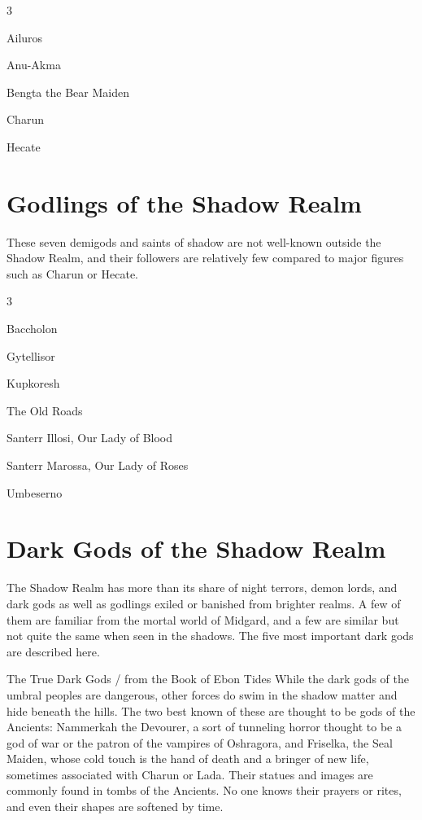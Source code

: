 \documentclass[10pt,a4paper,twoside,bg=print,twocolumn,openany,nodeprecatedcode]{dndbook}
\begin{document}
\begin{itemize}
\begin{multicols}{3}
\item Ailuros
\item Anu-Akma
\item Bengta the Bear Maiden
\item Charun
\item Hecate
\end{multicols}

\end{itemize}

\section{Godlings of the Shadow Realm}
These seven demigods and saints of shadow are not well-known outside the Shadow Realm, and their followers are relatively few compared to major figures such as Charun or Hecate.


\begin{itemize}
\begin{multicols}{3}
\item Baccholon
\item Gytellisor
\item Kupkoresh
\item The Old Roads
\item Santerr Illosi, Our Lady of Blood
\item Santerr Marossa, Our Lady of Roses
\item Umbeserno
\end{multicols}

\end{itemize}

\section{Dark Gods of the Shadow Realm}
The Shadow Realm has more than its share of night terrors, demon lords, and dark gods as well as godlings exiled or banished from brighter realms. A few of them are familiar from the mortal world of Midgard, and a few are similar but not quite the same when seen in the shadows. The five most important dark gods are described here.

\begin{DndSidebar}[float=!b]{The True Dark Gods / from the Book of Ebon Tides}
While the dark gods of the umbral peoples are dangerous, other forces do swim in the shadow matter and hide beneath the hills. The two best known of these are thought to be gods of the Ancients: Nammerkah the Devourer, a sort of tunneling horror thought to be a god of war or the patron of the vampires of Oshragora, and Friselka, the Seal Maiden, whose cold touch is the hand of death and a bringer of new life, sometimes associated with Charun or Lada. Their statues and images are commonly found in tombs of the Ancients. No one knows their prayers or rites, and even their shapes are softened by time.



\end{DndSidebar}
\end{document}
